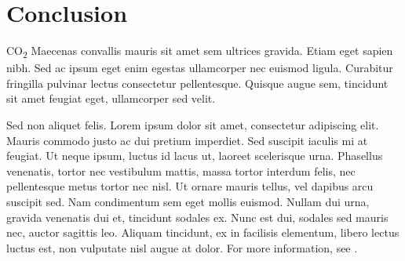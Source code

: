 \documentclass[10pt,letterpaper]{article}
\begin{document}
\section*{Conclusion}

CO\textsubscript{2} Maecenas convallis mauris sit amet sem ultrices gravida. Etiam eget sapien nibh. Sed ac ipsum eget enim egestas ullamcorper nec euismod ligula. Curabitur fringilla pulvinar lectus consectetur pellentesque. Quisque augue sem, tincidunt sit amet feugiat eget, ullamcorper sed velit.

Sed non aliquet felis. Lorem ipsum dolor sit amet, consectetur adipiscing elit. Mauris commodo justo ac dui pretium imperdiet. Sed suscipit iaculis mi at feugiat. Ut neque ipsum, luctus id lacus ut, laoreet scelerisque urna. Phasellus venenatis, tortor nec vestibulum mattis, massa tortor interdum felis, nec pellentesque metus tortor nec nisl. Ut ornare mauris tellus, vel dapibus arcu suscipit sed. Nam condimentum sem eget mollis euismod. Nullam dui urna, gravida venenatis dui et, tincidunt sodales ex. Nunc est dui, sodales sed mauris nec, auctor sagittis leo. Aliquam tincidunt, ex in facilisis elementum, libero lectus luctus est, non vulputate nisl augue at dolor. For more information, see .
\end{document}
